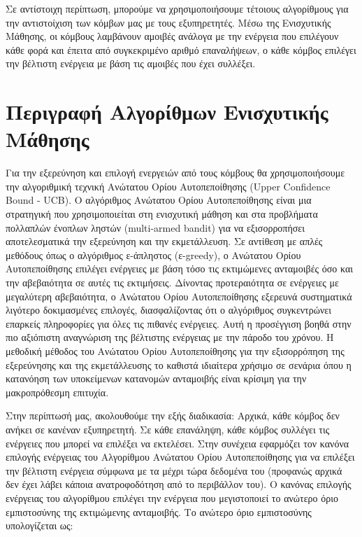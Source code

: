 Σε αντίστοιχη περίπτωση, μπορούμε να χρησιμοποιήσουμε τέτοιους αλγορίθμους για την αντιστοίχιση των κόμβων μας με τους εξυπηρετητές. Μέσω της Ενισχυτικής Μάθησης, οι κόμβους λαμβάνουν αμοιβές ανάλογα με την ενέργεια που επιλέγουν κάθε φορά και έπειτα από συγκεκριμένο αριθμό επαναλήψεων, ο κάθε κόμβος επιλέγει την βέλτιστη ενέργεια με βάση τις αμοιβές που έχει συλλέξει. 

\section{Περιγραφή Αλγορίθμων Ενισχυτικής Μάθησης}

Για την εξερεύνηση και επιλογή ενεργειών από τους κόμβους θα χρησιμοποιήσουμε την αλγοριθμική τεχνική Ανώτατου Ορίου Αυτοπεποίθησης (Upper Confidence Bound - UCB). Ο αλγόριθμος Ανώτατου Ορίου Αυτοπεποίθησης είναι μια στρατηγική που χρησιμοποιείται στη ενισχυτική μάθηση και στα προβλήματα πολλαπλών ένοπλων ληστών (multi-armed bandit) για να εξισορροπήσει αποτελεσματικά την εξερεύνηση και την εκμετάλλευση. Σε αντίθεση με απλές μεθόδους όπως ο αλγόριθμος ε-άπληστος (ε-greedy), ο Ανώτατου Ορίου Αυτοπεποίθησης επιλέγει ενέργειες με βάση τόσο τις εκτιμώμενες ανταμοιβές όσο και την αβεβαιότητα σε αυτές τις εκτιμήσεις. Δίνοντας προτεραιότητα σε ενέργειες με μεγαλύτερη αβεβαιότητα, ο Ανώτατου Ορίου Αυτοπεποίθησης εξερευνά συστηματικά λιγότερο δοκιμασμένες επιλογές, διασφαλίζοντας ότι ο αλγόριθμος συγκεντρώνει επαρκείς πληροφορίες για όλες τις πιθανές ενέργειες. Αυτή η προσέγγιση βοηθά στην πιο αξιόπιστη αναγνώριση της βέλτιστης ενέργειας με την πάροδο του χρόνου. Η μεθοδική μέθοδος του Ανώτατου Ορίου Αυτοπεποίθησης για την εξισορρόπηση της εξερεύνησης και της εκμετάλλευσης το καθιστά ιδιαίτερα χρήσιμο σε σενάρια όπου η κατανόηση των υποκείμενων κατανομών ανταμοιβής είναι κρίσιμη για την μακροπρόθεσμη επιτυχία. 

Στην περίπτωσή μας, ακολουθούμε την εξής διαδικασία: Αρχικά, κάθε κόμβος δεν ανήκει σε κανέναν εξυπηρετητή. Σε κάθε επανάληψη, κάθε κόμβος συλλέγει τις ενέργειες που μπορεί να επιλέξει να εκτελέσει. Στην συνέχεια εφαρμόζει τον κανόνα επιλογής ενέργειας του Αλγορίθμου Ανώτατου Ορίου Αυτοπεποίθησης για να επιλέξει την βέλτιστη ενέργεια σύμφωνα με τα μέχρι τώρα δεδομένα του (προφανώς αρχικά δεν έχει λάβει κάποια ανατροφοδότηση από το περιβάλλον του). Ο κανόνας επιλογής ενέργειας του αλγορίθμου επιλέγει την ενέργεια που μεγιστοποιεί το ανώτερο όριο εμπιστοσύνης της εκτιμώμενης ανταμοιβής. Το ανώτερο όριο εμπιστοσύνης υπολογίζεται ως:

